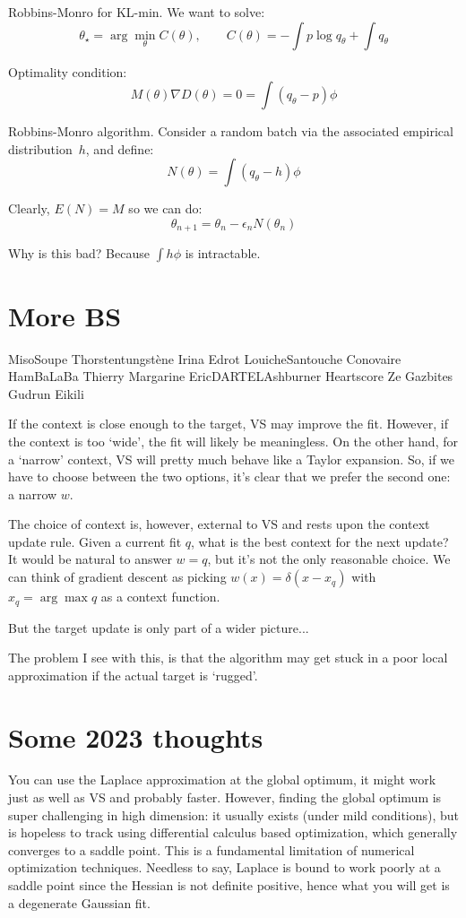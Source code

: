 \documentclass{article}
\begin{document}
Robbins-Monro for KL-min. We want to solve:
$$
\theta_\star = \arg\min_\theta C(\theta),
\qquad
C(\theta) = -\int p \log q_\theta + \int q_\theta
$$

Optimality condition:
$$
M(\theta)\nabla D(\theta) = 0 = \int (q_\theta-p)\phi
$$

Robbins-Monro algorithm. Consider a random batch via the associated empirical distribution~$h$, and define:
$$
N(\theta) = \int (q_\theta-h) \phi
$$

Clearly, $E(N)=M$ so we can do:
$$
\theta_{n+1} = \theta_n - \epsilon_n N(\theta_n)
$$

Why is this bad? Because $\int h\phi$ is intractable.




\section{More BS}


MisoSoupe
Thorstentungstène
Irina
Edrot
LouicheSantouche
Conovaire
HamBaLaBa
Thierry Margarine
EricDARTELAshburner
Heartscore
Ze Gazbites
Gudrun Eikili

If the context is close enough to the target, VS may improve the fit. However, if the context is too `wide', the fit will likely be meaningless. On the other hand, for a `narrow' context, VS will pretty much behave like a Taylor expansion. So, if we have to choose between the two options, it's clear that we prefer the second one: a narrow $w$.

The choice of context is, however, external to VS and rests upon the context update rule. Given a current fit $q$, what is the best context for the next update? It would be natural to answer $w=q$, but it's not the only reasonable choice. We can think of gradient descent as picking $w(x)=\delta(x-x_q)$ with $x_q=\arg\max q$ as a context function.

But the target update is only part of a wider picture...

The problem I see with this, is that the algorithm may get stuck in a poor local approximation if the actual target is `rugged'.

\section{Some 2023 thoughts}

You can use the Laplace approximation at the global optimum, it might work just as well as VS and probably faster. However, finding the global optimum is super challenging in high dimension: it usually exists (under mild conditions), but is hopeless to track using differential calculus based optimization, which generally converges to a saddle point. This is a fundamental limitation of numerical optimization techniques. Needless to say, Laplace is bound to work poorly at a saddle point since the Hessian is not definite positive, hence what you will get is a degenerate Gaussian fit.
\end{document}

